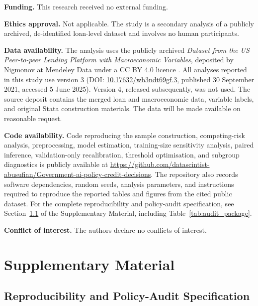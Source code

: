 \documentclass[10pt]{article}
\begin{document}
 \noindent\textbf{Funding.} This research received no external funding.

 \noindent\textbf{Ethics approval.} Not applicable. The study is a secondary analysis of a publicly archived, de-identified loan-level dataset and involves no human participants.

\noindent\textbf{Data availability.}
The analysis uses the publicly archived \textit{Dataset from the US Peer-to-peer Lending Platform with Macroeconomic Variables}, deposited by Nigmonov at Mendeley Data under a CC BY 4.0 licence \cite{ref48}. All analyses reported in this study use version 3 (DOI: \href{https://doi.org/10.17632/wb3ndt69gf.3}{10.17632/wb3ndt69gf.3}, published 30 September 2021, accessed 5 June 2025). Version 4, released subsequently, was not used. The source deposit contains the merged loan and macroeconomic data, variable labels, and original Stata construction materials. The data will be made available on reasonable request.

\noindent\textbf{Code availability.}
Code reproducing the sample construction, competing-risk analysis, preprocessing, model estimation, training-size sensitivity analysis, paired inference, validation-only recalibration, threshold optimisation, and subgroup diagnostics is publicly available at \url{https://github.com/datascintist-abusufian/Government-ai-policy-credit-decisions}. The repository also records software dependencies, random seeds, analysis parameters, and instructions required to reproduce the reported tables and figures from the cited public dataset. For the complete reproducibility and policy-audit specification, see Section~\ref{app:repro} of the Supplementary Material, including Table~\ref{tab:audit_package}.

 \noindent\textbf{Conflict of interest.} The authors declare no conflicts of interest.


\section{Supplementary Material}


\subsection{Reproducibility and Policy-Audit Specification}
\label{app:repro}
\end{document}
